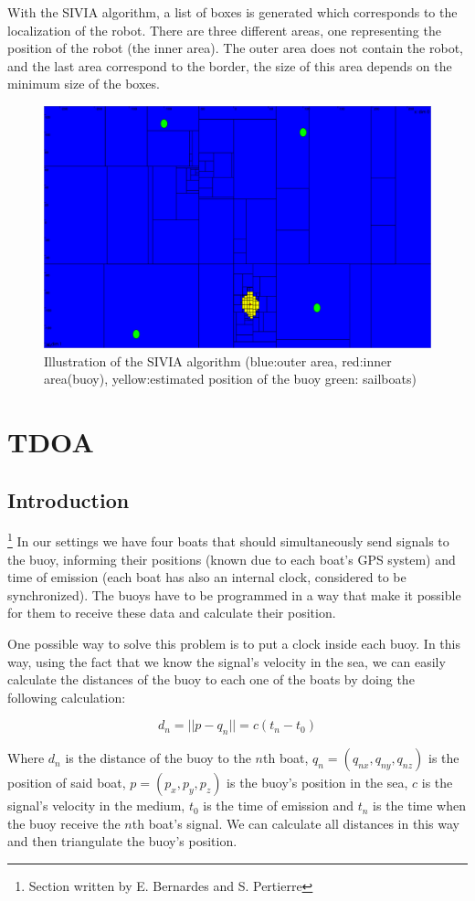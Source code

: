 \documentclass[a4paper]{report}
\begin{document}
With the SIVIA algorithm, a list of boxes is generated which corresponds to the localization of the robot. There are three different areas, one representing the position of the robot (the inner area). The outer area does not contain the robot, and the last area correspond to the border, the size of this area depends on the minimum size of the boxes.
\begin{figure}[H]
	\centering
    \includegraphics[width=0.4\linewidth]{image/loca_IA.png}
    \begin{center}\caption{ Illustration of the SIVIA algorithm (blue:outer area, red:inner area(buoy), yellow:estimated position of the buoy green: sailboats)}\end{center}
    \label{fig:SIVIA picture}
\end{figure}

\section{TDOA} \label{section:tdoa}
\subsection{Introduction}
\footnote{Section written by E. Bernardes and S. Pertierre} 
In our settings we have four boats that should simultaneously send signals to the buoy, informing their positions (known due to each boat's GPS system) and time of emission (each boat has also an internal clock, considered to be synchronized). 
%
The buoys have to be programmed in a way that make it possible for them to receive these data and calculate their position. 

One possible way to solve this problem is to put a clock inside each buoy.
%
In this way, using the fact that we know the signal's velocity in the sea, we can easily calculate the distances of the buoy to each one of the boats by doing the following calculation:

\begin{equation}
	d_n = ||p - q_n|| = c(t_n - t_0)
	\label{eq:distance}
\end{equation}

Where $d_n$ is the distance of the buoy to the $n$th boat, $q_n = (q_{nx},q_{ny},q_{nz})$ is the position of said boat, $p = (p_x,p_y,p_z)$ is the buoy's position in the sea, $c$ is the signal's velocity in the medium, $t_0$ is the time of emission and $t_n$ is the time when the buoy receive the $n$th boat's signal. 
%
We can calculate all distances in this way and then triangulate the buoy's position.
\end{document}
